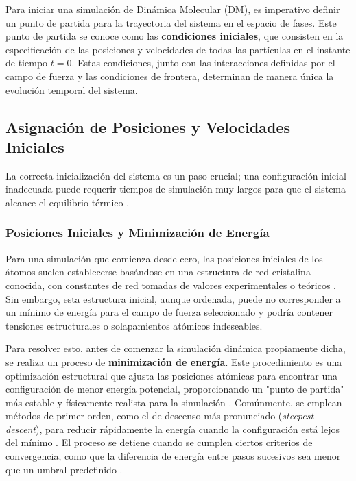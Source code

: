 Para iniciar una simulación de Dinámica Molecular (DM), es imperativo definir un punto de partida para la trayectoria del sistema en el espacio de fases. Este punto de partida se conoce como las \textbf{condiciones iniciales}, que consisten en la especificación de las posiciones y velocidades de todas las partículas en el instante de tiempo $t=0$. Estas condiciones, junto con las interacciones definidas por el campo de fuerza y las condiciones de frontera, determinan de manera única la evolución temporal del sistema.

\subsection{Asignación de Posiciones y Velocidades Iniciales}

La correcta inicialización del sistema es un paso crucial; una configuración inicial inadecuada puede requerir tiempos de simulación muy largos para que el sistema alcance el equilibrio térmico \cite[12]{zhou2022molecular}.

\subsubsection{Posiciones Iniciales y Minimización de Energía}

Para una simulación que comienza desde cero, las posiciones iniciales de los átomos suelen establecerse basándose en una estructura de red cristalina conocida, con constantes de red tomadas de valores experimentales o teóricos \cite[12]{zhou2022molecular}. Sin embargo, esta estructura inicial, aunque ordenada, puede no corresponder a un mínimo de energía para el campo de fuerza seleccionado y podría contener tensiones estructurales o solapamientos atómicos indeseables.

Para resolver esto, antes de comenzar la simulación dinámica propiamente dicha, se realiza un proceso de \textbf{minimización de energía}. Este procedimiento es una optimización estructural que ajusta las posiciones atómicas para encontrar una configuración de menor energía potencial, proporcionando un "punto de partida" más estable y físicamente realista para la simulación \cite[12]{zhou2022molecular}. Comúnmente, se emplean métodos de primer orden, como el de descenso más pronunciado (\textit{steepest descent}), para reducir rápidamente la energía cuando la configuración está lejos del mínimo \cite[23]{zhou2022molecular}. El proceso se detiene cuando se cumplen ciertos criterios de convergencia, como que la diferencia de energía entre pasos sucesivos sea menor que un umbral predefinido \cite[23]{zhou2022molecular}.


